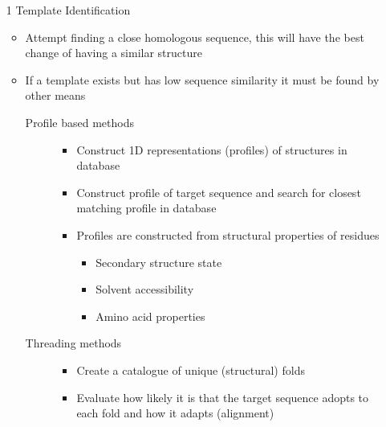 \documentclass[a4paper]{article}
\begin{document}
\begin{enumerate}
  \item[1]
    Template Identification

    \begin{itemize}
      \item
        Attempt finding a close homologous sequence, this will have the best
        change of having a similar structure

      \item
        If a template exists but has low sequence similarity it must be found by
        other means

        \begin{description}
          \item[Profile based methods] \hfill
            \begin{itemize}
              \item
                Construct 1D representations (profiles) of structures in
                database

              \item
                Construct profile of target sequence and search for closest
                matching profile in database

              \item
                Profiles are constructed from structural properties of residues

                \begin{itemize}
                  \item
                    Secondary structure state

                  \item
                    Solvent accessibility

                  \item
                    Amino acid properties
                \end{itemize}
            \end{itemize}

          \item[Threading methods] \hfill
            \begin{itemize}
              \item
                Create a catalogue of unique (structural) folds

              \item
                Evaluate how likely it is that the target sequence adopts to
                each fold and how it adapts (alignment)


\end{itemize}
\end{description}
\end{itemize}
\end{enumerate}
\end{document}
